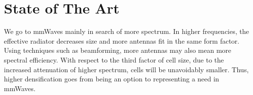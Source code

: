 \section{State of The Art}
\label{sec:int_state}

We go to mmWaves mainly in search of more spectrum.
In higher frequencies, the effective radiator decreases size and more antennas fit in the same form factor.
Using techniques such as beamforming, more antennas may also mean more spectral efficiency. 
With respect to the third factor of cell size, due to the increased attenuation of higher spectrum, cells will be unavoidably smaller.
Thus, higher densification goes from being an option to representing a need in mmWaves. \cite{sanguinetti2019massive}

